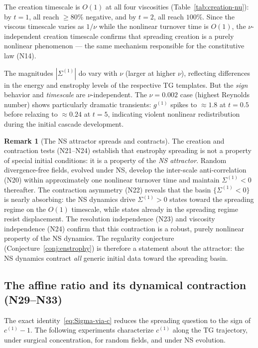 \documentclass[11pt]{article}
\theoremstyle{definition}
\newtheorem{remark}[theorem]{Remark}
\begin{document}
The creation timescale is $O(1)$ at all four
viscosities (Table~\ref{tab:creation-nu}): by $t=1$,
all reach $\geq 80\%$ negative, and by $t=2$, all
reach $100\%$.  Since the viscous timescale
varies as $1/\nu$ while the nonlinear turnover
time is $O(1)$, the $\nu$-independent creation
timescale confirms that spreading creation is a
purely nonlinear phenomenon --- the same mechanism
responsible for the constitutive law (N14).

The magnitudes $|\Sigma^{(1)}|$ do vary with
$\nu$ (larger at higher $\nu$), reflecting
differences in the energy and enstrophy levels
of the respective TG templates.  But the
\emph{sign} behavior and \emph{timescale} are
$\nu$-independent.  The $\nu=0.002$ case (highest
Reynolds number) shows particularly dramatic
transients: $g^{(1)}$ spikes to $\approx 1.8$ at
$t=0.5$ before relaxing to $\approx 0.24$ at $t=5$,
indicating violent nonlinear redistribution during
the initial cascade development.

\begin{remark}[The NS attractor spreads and contracts]
\label{rem:attractor}
The creation and contraction tests (N21--N24)
establish that enstrophy spreading is not a property
of special initial conditions: it is a property
of the \emph{NS attractor}.  Random divergence-free
fields, evolved under NS, develop the inter-scale
anti-correlation (N20) within approximately one
nonlinear turnover time and maintain
$\Sigma^{(1)}<0$ thereafter.  The contraction
asymmetry (N22) reveals that the basin
$\{\Sigma^{(1)}<0\}$ is nearly absorbing:
the NS dynamics drive $\Sigma^{(1)}>0$ states
toward the spreading regime on the $O(1)$
timescale, while states already in the spreading
regime resist displacement.  The resolution
independence (N23) and viscosity independence (N24)
confirm that this contraction is a robust,
purely nonlinear property of the NS dynamics.
The regularity
conjecture (Conjecture~\ref{conj:enstrophy})
is therefore a statement about the attractor:
the NS dynamics contract \emph{all} generic
initial data toward the spreading basin.
\end{remark}


\subsection{The affine ratio and its dynamical contraction
(N29--N33)}
\label{sec:affine-experiments}

The exact identity~\eqref{eq:Sigma-via-c} reduces the
spreading question to the sign of $c^{(1)}-1$.  The
following experiments characterize $c^{(1)}$ along
the TG trajectory, under surgical concentration,
for random fields, and under NS evolution.
\end{document}
